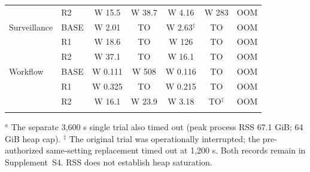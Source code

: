 \begin{tabular}{@{}llccccc@{}}
 & R2 & W 15.5 & W 38.7 & W 4.16 & W 283 & OOM\\
\addlinespace[2pt]
Surveillance & BASE & W 2.01 & TO & W 2.63$^{\dagger}$ & TO & OOM\\
 & R1 & W 18.6 & TO & W 126 & TO & OOM\\
 & R2 & W 37.1 & TO & W 16.1 & TO & OOM\\
\addlinespace[2pt]
Workflow & BASE & W 0.111 & W 508 & W 0.116 & TO & OOM\\
 & R1 & W 0.325 & TO & W 0.215 & TO & OOM\\
 & R2 & W 16.1 & W 23.9 & W 3.18 & TO$^{\ddagger}$ & OOM\\
\addlinespace[2pt]
\bottomrule
\end{tabular}\endgroup
\par{}\par{\scriptsize $^{a}$ The separate 3,600 s single trial also timed out (peak process RSS 67.1 GiB; 64 GiB heap cap). $^{\ddagger}$ The original trial was operationally interrupted; the pre-authorized same-setting replacement timed out at 1,200 s. Both records remain in Supplement~S4. RSS does not establish heap saturation.}
